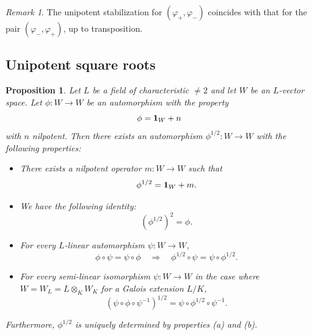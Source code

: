 \documentclass[a4paper,12pt,reqno]{amsart}
\theoremstyle{plain}
\newtheorem{proposition}[theorem]{Proposition}
\theoremstyle{remark}
\newtheorem{remark}[theorem]{Remark}
\begin{document}
    \begin{remark}\label{rmk:unipotentstabilization}
      The unipotent stabilization for $(\varphi_+, \varphi_-)$ coincides with that for the pair $(\varphi_-, \varphi_+)$, up to transposition.
    \end{remark}

  \subsection{Unipotent square roots}
    
    \begin{proposition}\label{prop:unipotentsquareroots}
      Let $L$ be a field of characteristic $\neq 2$ and let $W$ be an $L$-vector space. Let $\phi\colon W \to W$ be an automorphism with the property
      \begin{equation}
        \phi={\bf1}_{W}+n
        \label{eq:phinilpotency}
      \end{equation}
      with $n$ nilpotent.
      Then there exists an automorphism $\phi^{1/2}\colon W\to W$ with the following properties:
      \begin{itemize}
      \item[(a)] There exists a nilpotent operator $m\colon W \to W$ such that
        \begin{equation}
        \phi^{1/2}={\bf1}_{W}+m.
        \end{equation}
      \item[(b)] We have the following identity:
        \begin{equation}
        \left(\phi^{1/2}\right)^2=\phi.
        \end{equation}
      \item[(c)] For every $L$-linear automorphism $\psi\colon W\to W$,
        \begin{equation}
          \phi\circ\psi=\psi\circ\phi\quad\Rightarrow\quad \phi^{1/2}\circ\psi=\psi\circ\phi^{1/2}.
        \end{equation}
      \item[(d)] For every semi-linear isomorphism $\psi\colon W \to W$ in the case where $W=W_L = L \otimes_K W_K$ for a Galois extension $L/K$,
        \begin{equation}
          \left(\psi\circ\phi\circ\psi^{-1}\right)^{1/2}=
          \psi\circ\phi^{1/2}\circ\psi^{-1}.
          \label{eq:semilinearconjugation}
        \end{equation}        
      \end{itemize}
      Furthermore, $\phi^{1/2}$ is uniquely determined by properties (a) and (b).
    \end{proposition}
\end{document}
